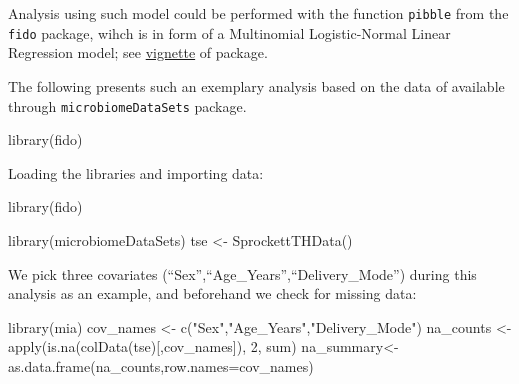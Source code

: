 \documentclass[
]{book}
\newenvironment{Shaded}{\begin{snugshade}}{\end{snugshade}}
\newcommand{\AttributeTok}[1]{\textcolor[rgb]{0.77,0.63,0.00}{#1}}
\newcommand{\DecValTok}[1]{\textcolor[rgb]{0.00,0.00,0.81}{#1}}
\newcommand{\FunctionTok}[1]{\textcolor[rgb]{0.00,0.00,0.00}{#1}}
\newcommand{\NormalTok}[1]{#1}
\newcommand{\OtherTok}[1]{\textcolor[rgb]{0.56,0.35,0.01}{#1}}
\newcommand{\StringTok}[1]{\textcolor[rgb]{0.31,0.60,0.02}{#1}}
\begin{document}
Analysis using such model could be performed with the function
\texttt{pibble} from the \texttt{fido} package, wihch is in form of a Multinomial
Logistic-Normal Linear Regression model; see
\href{https://jsilve24.github.io/fido/articles/introduction-to-fido.html}{vignette}
of package.

The following presents such an exemplary analysis based on the
data of \citet{Sprockett2020} available
through \texttt{microbiomeDataSets} package.

\begin{Shaded}
\begin{Highlighting}[]
\FunctionTok{library}\NormalTok{(fido)}
\end{Highlighting}
\end{Shaded}

Loading the libraries and importing data:

\begin{Shaded}
\begin{Highlighting}[]
\FunctionTok{library}\NormalTok{(fido)}
\end{Highlighting}
\end{Shaded}

\begin{Shaded}
\begin{Highlighting}[]
\FunctionTok{library}\NormalTok{(microbiomeDataSets)}
\NormalTok{tse }\OtherTok{\textless{}{-}} \FunctionTok{SprockettTHData}\NormalTok{()}
\end{Highlighting}
\end{Shaded}

We pick three covariates (``Sex'',``Age\_Years'',``Delivery\_Mode'') during this
analysis as an example, and beforehand we check for missing data:

\begin{Shaded}
\begin{Highlighting}[]
\FunctionTok{library}\NormalTok{(mia)}
\NormalTok{cov\_names }\OtherTok{\textless{}{-}} \FunctionTok{c}\NormalTok{(}\StringTok{"Sex"}\NormalTok{,}\StringTok{"Age\_Years"}\NormalTok{,}\StringTok{"Delivery\_Mode"}\NormalTok{)}
\NormalTok{na\_counts }\OtherTok{\textless{}{-}} \FunctionTok{apply}\NormalTok{(}\FunctionTok{is.na}\NormalTok{(}\FunctionTok{colData}\NormalTok{(tse)[,cov\_names]), }\DecValTok{2}\NormalTok{, sum)}
\NormalTok{na\_summary}\OtherTok{\textless{}{-}}\FunctionTok{as.data.frame}\NormalTok{(na\_counts,}\AttributeTok{row.names=}\NormalTok{cov\_names)}
\end{Highlighting}
\end{Shaded}
\end{document}
